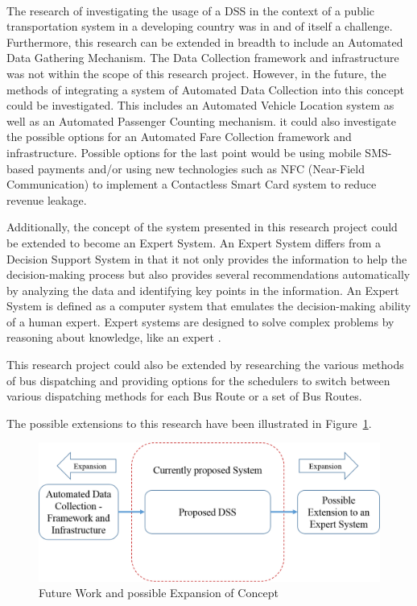 \paragraph{} The research of investigating the usage of a DSS in the context of a public transportation system in a developing country was in and of itself a challenge. Furthermore, this research can be extended in breadth to include an Automated Data Gathering Mechanism. The Data Collection framework and infrastructure was not within the scope of this research project. However, in the future, the methods of integrating a system of Automated Data Collection into this concept could be investigated. This includes an Automated Vehicle Location system as well as an Automated Passenger Counting mechanism. it could also investigate the possible options for an Automated Fare Collection framework and infrastructure. Possible options for the last point would be using mobile SMS-based payments and/or using new technologies such as NFC (Near-Field Communication) to implement a Contactless Smart Card system to reduce revenue leakage.

Additionally, the concept of the system presented in this research project could be extended to become an Expert System. An Expert System differs from a Decision Support System in that it not only provides the information to help the decision-making process but also provides several recommendations automatically by analyzing the data and identifying key points in the information. An Expert System is defined as a computer system that emulates the decision-making ability of a human expert. Expert systems are designed to solve complex problems by reasoning about knowledge, like an expert \cite{Jackson1998}.

This research project could also be extended by researching the various methods of bus dispatching and providing options for the schedulers to switch between various dispatching methods for each Bus Route or a set of Bus Routes.

The possible extensions to this research have been illustrated in Figure~\ref{image-futureWork}.

\begin {figure} [h]
\centering
\includegraphics [scale=0.5] {futureWork}
\caption [Future Work and possible Expansion of Concept] {Future Work and possible Expansion of Concept}
\label {image-futureWork}
\end {figure}

